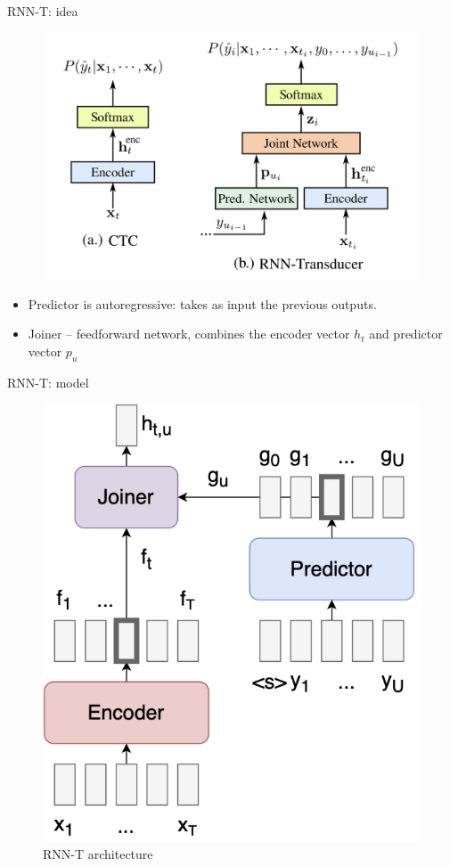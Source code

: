 \begin{frame}{RNN-T: idea}
    \begin{figure}
    	\centering
    	\includegraphics[width=0.75\linewidth]{figs/rnnt.png}
    \end{figure}
    \begin{itemize}
        \item Predictor is autoregressive: takes as input the previous outputs.
        \item Joiner -- feedforward network, combines the encoder vector $h_t$ and predictor vector $p_u$
    \end{itemize}


\end{frame}
\begin{frame}{RNN-T: model}
    \begin{figure}
    	\centering
    	\includegraphics[width=0.55\linewidth]{figs/rnnt_model.png}
    	\caption{RNN-T architecture}
    \end{figure}


\end{frame}
